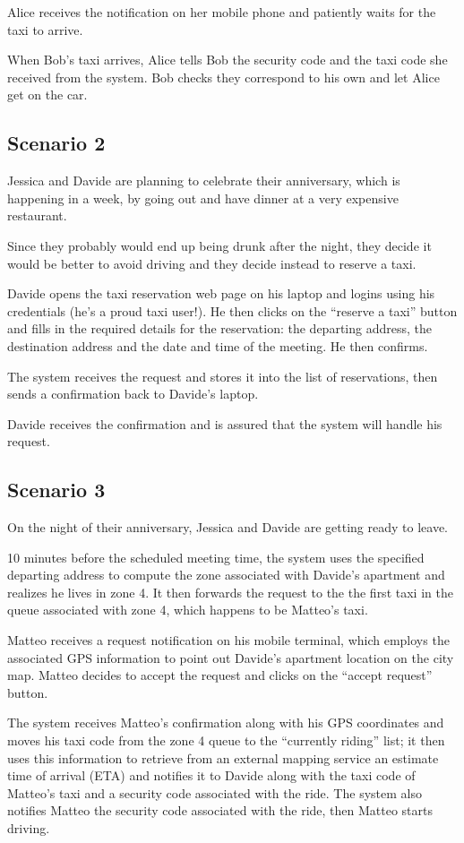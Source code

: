 Alice receives the notification on her mobile phone and patiently waits for the taxi to arrive.

When Bob’s taxi arrives, Alice tells Bob the security code and the taxi code she received from the system. Bob checks they correspond to his own and let Alice get on the car.


\subsection{Scenario 2}
Jessica and Davide are planning to celebrate their anniversary, which is happening in a week, by going out and have dinner at a very expensive restaurant.

Since they probably would end up being drunk after the night, they decide it would be better to avoid driving and they decide instead to reserve a taxi.

Davide opens the taxi reservation web page on his laptop and logins using his credentials (he’s a proud taxi user!). He then clicks on the “reserve a taxi” button and fills in the required details for the reservation: the departing address, the destination address and the date and time of the meeting. He then confirms.

The system receives the request and stores it into the list of reservations, then sends a confirmation back to Davide’s laptop.

Davide receives the confirmation and is assured that the system will handle his request.


\subsection{Scenario 3}
On the night of their anniversary, Jessica and Davide are getting ready to leave.

10 minutes before the scheduled meeting time, the system uses the specified departing address to compute the zone associated with Davide’s apartment and realizes he lives in zone 4. It then forwards the request to the the first taxi in the queue associated with zone 4, which happens to be Matteo’s taxi.

Matteo receives a request notification on his mobile terminal, which employs the associated GPS information to point out Davide’s apartment location on the city map. Matteo decides to accept the request and clicks on the “accept request” button.

The system receives Matteo’s confirmation along with his GPS coordinates and moves his taxi code from the zone 4 queue to the “currently riding” list; it then uses this information to retrieve from an external mapping service an estimate time of arrival (ETA) and notifies it to Davide along with the taxi code of Matteo’s taxi and a security code associated with the ride. The system also notifies Matteo the security code associated with the ride, then Matteo starts driving.

